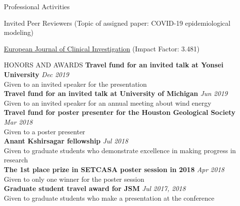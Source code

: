 \documentclass{resume} %
\begin{document}
\begin{rSection}{Professional Activities}
\begin{rSubsection}{
Invited Peer Reviewers (Topic of assigned paper: COVID-19 epidemiological modeling)}{}{}{}
\item \href{https://onlinelibrary.wiley.com/journal/13652362}{European Journal of Clinical Investigation} (Impact Factor: 3.481)
\end{rSubsection}
\end{rSection}

\begin{rSection}{HONORS AND AWARDS}
{\bf Travel fund for an invited talk at Yonsei University} \hfill {\em Dec 2019} \\ 
Given to an invited speaker for the presentation
\\
{\bf Travel fund for an invited talk at University of Michigan} \hfill {\em Jun 2019} \\ 
Given to an invited speaker for an annual meeting about wind energy
\\
{\bf Travel fund for poster presenter for the Houston Geological Society} \hfill {\em Mar 2018} \\ 
Given to a poster presenter 
\\
{\bf Anant Kshirsagar fellowship} \hfill {\em Jul 2018} \\ 
Given to graduate students who demonstrate excellence in making progress in research
\\
{\bf The 1st place prize in SETCASA poster session in 2018 } \hfill {\em Apr 2018} \\ 
Given to only one winner for the poster session 
\\
{\bf Graduate student travel award for JSM} \hfill {\em Jul 2017, 2018} \\ 
Given to graduate students who make a presentation at the conference
\end{rSection}
\end{document}
